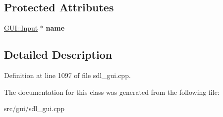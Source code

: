 \subsection*{Protected Attributes}
\begin{DoxyCompactItemize}
\item 
\hypertarget{classSetLocalSize_a04b30f6369fc83b25a0047080f78fa2c}{\hyperlink{classGUI_1_1Input}{G\-U\-I\-::\-Input} $\ast$ {\bfseries name}}\label{classSetLocalSize_a04b30f6369fc83b25a0047080f78fa2c}

\end{DoxyCompactItemize}


\subsection{Detailed Description}


Definition at line 1097 of file sdl\-\_\-gui.\-cpp.



The documentation for this class was generated from the following file\-:\begin{DoxyCompactItemize}
\item 
src/gui/sdl\-\_\-gui.\-cpp\end{DoxyCompactItemize}
